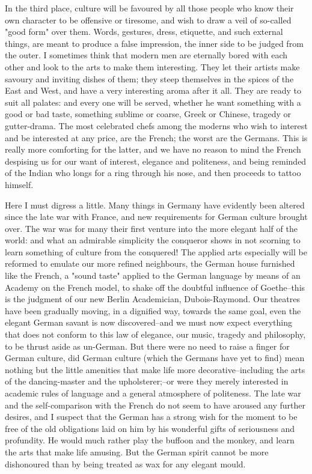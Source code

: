 In the third place, culture will be favoured by all those people who
know their own character to be offensive or tiresome, and wish to
draw a veil of so-called "good form" over them. Words, gestures,
dress, etiquette, and such external things, are meant to produce a
false impression, the inner side to be judged from the outer. I
sometimes think that modern men are eternally bored with each other
and look to the arts to make them interesting. They let their artists
make savoury and inviting dishes of them; they steep themselves in
the spices of the East and West, and have a very interesting aroma
after it all. They are ready to suit all palates: and every one will
be served, whether he want something with a good or bad taste,
something sublime or coarse, Greek or Chinese, tragedy or
gutter-drama. The most celebrated chefs among the moderns who wish to
interest and be interested at any price, are the French; the worst
are the Germans. This is really more comforting for the latter, and
we have no reason to mind the French despising us for our want of
interest, elegance and politeness, and being reminded of the Indian
who longs for a ring through his nose, and then proceeds to tattoo
himself.

Here I must digress a little. Many things in Germany have evidently
been altered since the late war with France, and new requirements for
German culture brought over. The war was for many their first venture
into the more elegant half of the world: and what an admirable
simplicity the conqueror shows in not scorning to learn something of
culture from the conquered! The applied arts especially will be
reformed to emulate our more refined neighbours, the German house
furnished like the French, a "sound taste" applied to the German
language by means of an Academy on the French model, to shake off the
doubtful influence of Goethe--this is the judgment of our new Berlin
Academician, Dubois-Raymond. Our theatres have been gradually moving,
in a dignified way, towards the same goal, even the elegant German
savant is now discovered--and we must now expect everything that does
not conform to this law of elegance, our music, tragedy and
philosophy, to be thrust aside as un-German. But there were no need
to raise a finger for German culture, did German culture (which the
Germans have yet to find) mean nothing but the little amenities that
make life more decorative--including the arts of the dancing-master
and the upholsterer;--or were they merely interested in academic
rules of language and a general atmosphere of politeness. The late
war and the self-comparison with the French do not seem to have
aroused any further desires, and I suspect that the German has a
strong wish for the moment to be free of the old obligations laid on
him by his wonderful gifts of seriousness and profundity. He would
much rather play the buffoon and the monkey, and learn the arts that
make life amusing. But the German spirit cannot be more dishonoured
than by being treated as wax for any elegant mould.

